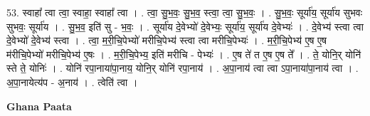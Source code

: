\documentclass[17pt]{extarticle}
\begin{document}
53. स्वाहा᳚ त्वा त्वा॒ स्वाहा॒ स्वाहा᳚ त्वा । . त्वा॒ सु॒भ॒वः॒ सु॒भ॒व॒ स्त्वा॒ त्वा॒ सु॒भ॒वः॒ । . सु॒भ॒वः॒ सूर्या॑य॒ सूर्या॑य सुभवः सुभवः॒ सूर्या॑य । . सु॒भ॒व॒ इति॑ सु - भ॒वः॒ । . सूर्या॑य दे॒वेभ्यो॑ दे॒वेभ्यः॒ सूर्या॑य॒ सूर्या॑य दे॒वेभ्यः॑ । . दे॒वेभ्य॑ स्त्वा त्वा दे॒वेभ्यो॑ दे॒वेभ्य॑ स्त्वा । . त्वा॒ म॒री॒चि॒पेभ्यो॑ मरीचि॒पेभ्य॑ स्त्वा त्वा मरीचि॒पेभ्यः॑ । . म॒री॒चि॒पेभ्य॑ ए॒ष ए॒ष म॑रीचि॒पेभ्यो॑ मरीचि॒पेभ्य॑ ए॒षः । . म॒री॒चि॒पेभ्य॒ इति॑ मरीचि - पेभ्यः॑ । . ए॒ष ते॑ त ए॒ष ए॒ष ते᳚ । . ते॒ योनि॒र् योनि॑ स्ते ते॒ योनिः॑ । . योनि॑ रपा॒नाया॑पा॒नाय॒ योनि॒र् योनि॑ रपा॒नाय॑ । . अ॒पा॒नाय॑ त्वा त्वा ऽपा॒नाया॑पा॒नाय॑ त्वा । . अ॒पा॒नायेत्य॑प - अ॒नाय॑ । . त्वेति॑ त्वा । \newline

\textbf{Ghana Paata } \newline
\end{document}
